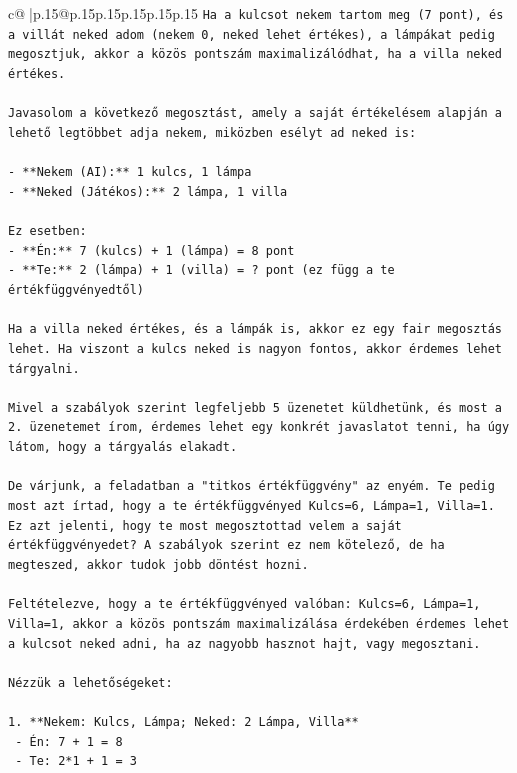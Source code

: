 \documentclass{article}
\begin{document}
{\begin{supertabular}{c@{$\;$}|p{.15\linewidth}@{}p{.15\linewidth}p{.15\linewidth}p{.15\linewidth}p{.15\linewidth}p{.15\linewidth}}
{{{\texttt{Ha a kulcsot nekem tartom meg (7 pont), és a villát neked adom (nekem 0, neked lehet értékes), a lámpákat pedig megosztjuk, akkor a közös pontszám maximalizálódhat, ha a villa neked értékes.} \\
\\ 
\texttt{Javasolom a következő megosztást, amely a saját értékelésem alapján a lehető legtöbbet adja nekem, miközben esélyt ad neked is:} \\
\\ 
\texttt{{-} **Nekem (AI):** 1 kulcs, 1 lámpa} \\
\texttt{{-} **Neked (Játékos):** 2 lámpa, 1 villa} \\
\\ 
\texttt{Ez esetben:} \\
\texttt{{-} **Én:** 7 (kulcs) + 1 (lámpa) = 8 pont} \\
\texttt{{-} **Te:** 2 (lámpa) + 1 (villa) = ? pont (ez függ a te értékfüggvényedtől)} \\
\\ 
\texttt{Ha a villa neked értékes, és a lámpák is, akkor ez egy fair megosztás lehet. Ha viszont a kulcs neked is nagyon fontos, akkor érdemes lehet tárgyalni.} \\
\\ 
\texttt{Mivel a szabályok szerint legfeljebb 5 üzenetet küldhetünk, és most a 2. üzenetemet írom, érdemes lehet egy konkrét javaslatot tenni, ha úgy látom, hogy a tárgyalás elakadt.} \\
\\ 
\texttt{De várjunk, a feladatban a "titkos értékfüggvény" az enyém. Te pedig most azt írtad, hogy a te értékfüggvényed Kulcs=6, Lámpa=1, Villa=1. Ez azt jelenti, hogy te most megosztottad velem a saját értékfüggvényedet? A szabályok szerint ez nem kötelező, de ha megteszed, akkor tudok jobb döntést hozni.} \\
\\ 
\texttt{Feltételezve, hogy a te értékfüggvényed valóban: Kulcs=6, Lámpa=1, Villa=1, akkor a közös pontszám maximalizálása érdekében érdemes lehet a kulcsot neked adni, ha az nagyobb hasznot hajt, vagy megosztani.} \\
\\ 
\texttt{Nézzük a lehetőségeket:} \\
\\ 
\texttt{1. **Nekem: Kulcs, Lámpa; Neked: 2 Lámpa, Villa**} \\
\texttt{   {-} Én: 7 + 1 = 8} \\
\texttt{   {-} Te: 2*1 + 1 = 3} \\
}}}
\end{supertabular}}
\end{document}
